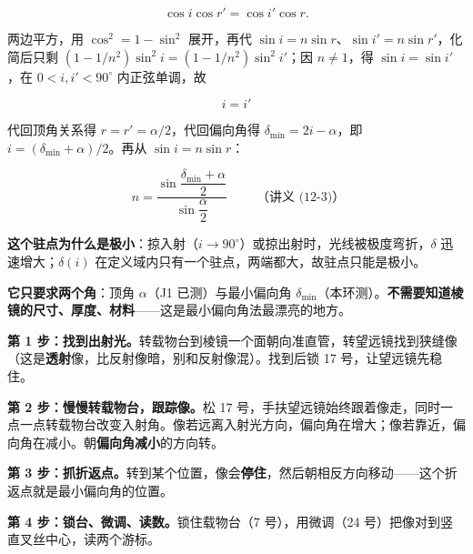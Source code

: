 \[
\cos i\cos r'=\cos i'\cos r .
\]

两边平方，用 $\cos^2=1-\sin^2$ 展开，再代 $\sin i=n\sin r$、$\sin i'=n\sin r'$，化简后只剩 $(1-1/n^2)\sin^2 i=(1-1/n^2)\sin^2 i'$；因 $n\neq1$，得 $\sin i=\sin i'$，在 $0<i,i'<90^{\circ}$ 内正弦单调，故

\[
\boxed{\,i=i'\,}
\]

代回顶角关系得 $r=r'=\alpha/2$，代回偏向角得 $\delta_{\min}=2i-\alpha$，即 $i=(\delta_{\min}+\alpha)/2$。再从 $\sin i=n\sin r$：

\[
\boxed{\;
n=\frac{\sin\dfrac{\delta_{\min}+\alpha}{2}}{\sin\dfrac{\alpha}{2}}
\;}
\qquad\text{（讲义 (12-3)）}
\]

\textbf{这个驻点为什么是极小}：掠入射（$i\to90^{\circ}$）或掠出射时，光线被极度弯折，$\delta$ 迅速增大；$\delta(i)$ 在定义域内只有一个驻点，两端都大，故驻点只能是极小。

\textbf{它只要求两个角}：顶角 $\alpha$（J1 已测）与最小偏向角 $\delta_{\min}$（本环测）。\textbf{不需要知道棱镜的尺寸、厚度、材料}——这是最小偏向角法最漂亮的地方。



\textbf{第 1 步：找到出射光。}转载物台到棱镜一个面朝向准直管，转望远镜找到狭缝像（这是\textbf{透射}像，比反射像暗，别和反射像混）。找到后锁 17 号，让望远镜先稳住。

\textbf{第 2 步：慢慢转载物台，跟踪像。}松 17 号，手扶望远镜始终跟着像走，同时一点一点转载物台改变入射角。像若远离入射光方向，偏向角在增大；像若靠近，偏向角在减小。朝\textbf{偏向角减小}的方向转。

\textbf{第 3 步：抓折返点。}转到某个位置，像会\textbf{停住}，然后朝相反方向移动——这个折返点就是最小偏向角的位置。

\textbf{第 4 步：锁台、微调、读数。}锁住载物台（7 号），用微调（24 号）把像对到竖直叉丝中心，读两个游标。


